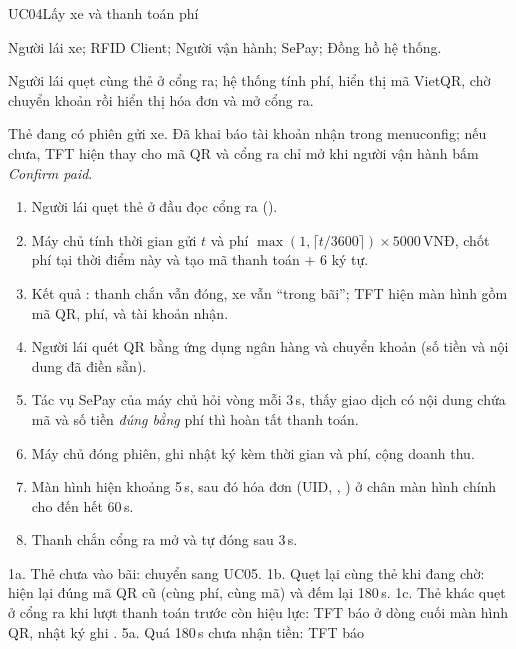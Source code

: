 \begin{usecase}{UC04}{Lấy xe và thanh toán phí}
\item[Tác nhân] Người lái xe; RFID Client; Người vận hành; SePay; Đồng hồ hệ thống.
\item[Mô tả] Người lái quẹt cùng thẻ ở cổng ra; hệ thống tính phí, hiển thị mã VietQR,
  chờ chuyển khoản rồi hiển thị hóa đơn và mở cổng ra.
\item[Tiền điều kiện] Thẻ đang có phiên gửi xe. Đã khai báo tài khoản nhận trong menuconfig;
  nếu chưa, TFT hiện  thay cho mã QR và cổng ra chỉ mở khi người vận hành bấm \emph{Confirm paid}.
\item[Luồng chính] \begin{enumerate}[nosep,leftmargin=1.3em]
  \item Người lái quẹt thẻ ở đầu đọc cổng ra ().
  \item Máy chủ tính thời gian gửi $t$ và phí $\max(1,\lceil t/3600\rceil)\times5000$\,VNĐ,
        chốt phí tại thời điểm này và tạo mã thanh toán  + 6 ký tự.
  \item Kết quả : thanh chắn vẫn đóng, xe vẫn ``trong bãi''; TFT
        hiện màn hình  gồm mã QR, phí,  và
        tài khoản nhận.
  \item Người lái quét QR bằng ứng dụng ngân hàng và chuyển khoản (số tiền và nội dung
        đã điền sẵn).
  \item Tác vụ SePay của máy chủ hỏi vòng mỗi 3\,s, thấy giao dịch có nội dung chứa mã
        và số tiền \emph{đúng bằng} phí thì hoàn tất thanh toán.
  \item Máy chủ đóng phiên, ghi nhật ký  kèm thời gian và phí, cộng doanh thu.
  \item Màn hình hiện  khoảng 5\,s, sau đó hóa đơn (UID, , ) ở chân màn hình chính cho đến hết 60\,s.
  \item Thanh chắn cổng ra mở và tự đóng sau 3\,s.
\end{enumerate}
\item[Ngoại lệ] 1a. Thẻ chưa vào bãi: chuyển sang UC05.
  1b. Quẹt lại cùng thẻ khi đang chờ: hiện lại đúng mã QR cũ (cùng phí, cùng mã) và đếm lại 180\,s.
  1c. Thẻ khác quẹt ở cổng ra khi lượt thanh toán trước còn hiệu lực: TFT báo
       ở dòng cuối màn hình QR, nhật ký ghi .
  5a. Quá 180\,s chưa nhận tiền: TFT báo 

\end{usecase}
